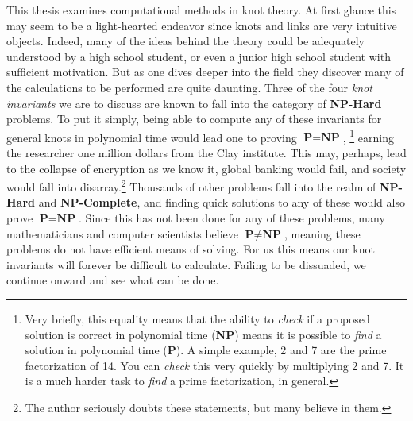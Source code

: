 This thesis examines computational methods in knot theory. At first glance
this may seem to be a light-hearted endeavor since knots and links are very
intuitive objects. Indeed, many of the ideas behind the theory could be
adequately understood by a high school student, or even a junior high school
student with sufficient motivation. But as one dives deeper into the field they
discover many of the calculations to be performed are quite daunting. Three of
the four \textit{knot invariants} we are to discuss are known to fall into
the category of \textbf{NP-Hard} problems. To put it simply, being able to
compute any of these invariants for general knots in polynomial time
would lead one to proving $\textbf{P}=\textbf{NP}$,
\footnote{%
    Very briefly, this equality means that the ability to \textit{check} if a
    proposed solution is correct in polynomial time (\textbf{NP}) means it is
    possible to \textit{find} a solution in polynomial time (\textbf{P}). A
    simple example, 2 and 7 are the prime factorization of 14. You can
    \textit{check} this very quickly by multiplying 2 and 7. It is a much
    harder task to \textit{find} a prime factorization, in general.
}
earning the researcher
one million dollars from the Clay institute. This may, perhaps, lead to the
collapse of encryption as we know it, global banking would fail, and society
would fall into disarray.\footnote{%
    The author seriously doubts these statements, but many believe in them.
}
Thousands of other problems fall into the realm of
\textbf{NP-Hard} and \textbf{NP-Complete}, and finding quick solutions to any
of these would also prove $\textbf{P}=\textbf{NP}$. Since this has not been
done for any of these problems, many mathematicians and computer scientists
believe $\textbf{P}\ne\textbf{NP}$, meaning these problems do not have
efficient means of solving. For us this means our knot invariants will forever
be difficult to calculate. Failing to be dissuaded, we continue onward and
see what can be done.
